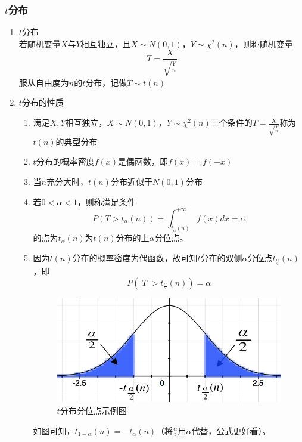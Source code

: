 \subsubsection{$t$分布}
\begin{enumerate}
	\item $t$分布 \\
	若随机变量$X$与$Y$相互独立，且$X\sim N(0,1)$，$Y\sim \chi^2(n)$，则称随机变量
	\begin{equation}
		T = \frac{X}{\sqrt{\frac{Y}{n}}}
	\end{equation}
	服从自由度为$n$的$t$分布，记做$T \sim t(n)$

	\item $t$分布的性质
	\begin{enumerate}
		\item 满足$X,Y$相互独立，$X\sim N(0,1)$，$Y\sim \chi^2(n)$三个条件的$T = \frac{X}{\sqrt{\frac{Y}{n}}}$称为$t(n)$的典型分布
		\item $t$分布的概率密度$f(x)$是偶函数，即$f(x) = f(-x)$
		\item 当$n$充分大时，$t(n)$分布近似于$N(0,1)$分布
		\item 若$0<\alpha<1$，则称满足条件
		\begin{equation}
			P(T > t_{\alpha}(n)) = \int_{t_{\alpha}(n)}^{+\infty}f(x)dx = \alpha
		\end{equation}
		的点为$t_{\alpha}(n)$为$t(n)$分布的上$\alpha$分位点。
		\item 因为$t(n)$分布的概率密度为偶函数，故可知$t$分布的双侧$\alpha$分位点$t_{\frac{\alpha}{2}}(n)$，即
		\begin{equation}
			P\left(|T|>t_{\frac{\alpha}{2}}(n)\right) = \alpha
		\end{equation}
		\begin{figure}[htbp]
			\centering
			\includegraphics[scale=0.9]{contents/t分布分位点}
			\caption{$t$分布分位点示例图}
		\end{figure}
		如图可知，$t_{1-\alpha}(n) = -t_{\alpha}(n)$（将$\frac{\alpha}{2}$用$\alpha$代替，公式更好看）。
	\end{enumerate}
\end{enumerate}

